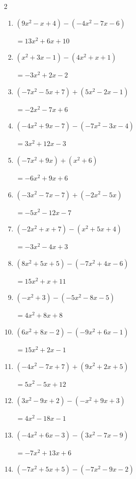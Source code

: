 \begin{multicols}{2}
\begin{enumerate}
  \item $(9x^{2}-x+4)-(-4x^{2}-7x-6)$

        $=13x^{2}+6x+10$

  \item $(x^{2}+3x-1)-(4x^{2}+x+1)$

        $=-3x^{2}+2x-2$

  \item $(-7x^{2}-5x+7)+(5x^{2}-2x-1)$

        $=-2x^{2}-7x+6$

  \item $(-4x^{2}+9x-7)-(-7x^{2}-3x-4)$

        $=3x^{2}+12x-3$

  \item $(-7x^{2}+9x)+(x^{2}+6)$

        $=-6x^{2}+9x+6$

  \item $(-3x^{2}-7x-7)+(-2x^{2}-5x)$

        $=-5x^{2}-12x-7$

\columnbreak %

\resetques

  \item $(-2x^{2}+x+7)-(x^{2}+5x+4)$

        $=-3x^{2}-4x+3$

  \item $(8x^{2}+5x+5)-(-7x^{2}+4x-6)$

        $=15x^{2}+x+11$

  \item $(-x^{2}+3)-(-5x^{2}-8x-5)$

        $=4x^{2}+8x+8$

  \item $(6x^{2}+8x-2)-(-9x^{2}+6x-1)$

        $=15x^{2}+2x-1$

  \item $(-4x^{2}-7x+7)+(9x^{2}+2x+5)$

        $=5x^{2}-5x+12$

  \item $(3x^{2}-9x+2)-(-x^{2}+9x+3)$

        $=4x^{2}-18x-1$

  \item $(-4x^{2}+6x-3)-(3x^{2}-7x-9)$

        $=-7x^{2}+13x+6$

  \item $(-7x^{2}+5x+5)-(-7x^{2}-9x-2)$


\end{enumerate}
\end{multicols}

